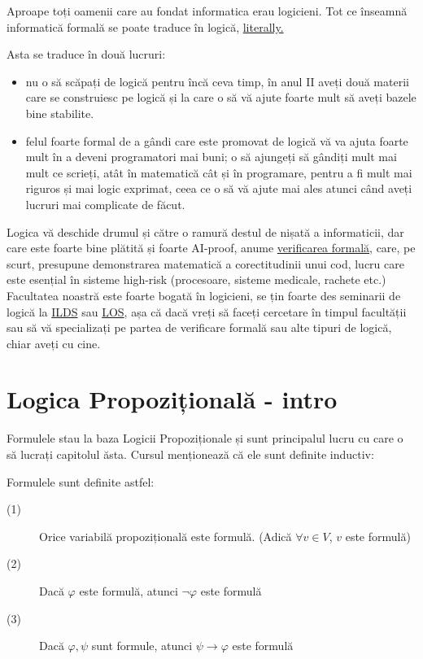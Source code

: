 Aproape toți oamenii care au fondat informatica erau logicieni. Tot ce înseamnă informatică formală se poate traduce în logică, \href{https://en.wikipedia.org/wiki/Curry%E2%80%93Howard_correspondence}{literally.}


\newpage

Asta se traduce în două lucruri:

\begin{itemize}
	\item nu o să scăpați de logică pentru încă ceva timp, în anul II aveți două materii care se construiesc pe logică și la care o să vă ajute foarte mult să aveți bazele bine stabilite.

	\item felul foarte formal de a gândi care este promovat de logică vă va ajuta foarte mult în a deveni programatori mai buni; o să ajungeți să gândiți mult mai mult ce scrieți, atât în matematică cât și în programare, pentru a fi mult mai riguros și
	      mai logic exprimat, ceea ce o să vă ajute mai ales atunci când aveți lucruri mai complicate de făcut.
\end{itemize}

Logica vă deschide drumul și către o ramură destul de nișată a informaticii, dar care este foarte bine plătită și foarte AI-proof, anume \href{https://en.wikipedia.org/wiki/Formal_verification}{verificarea formală}, care,
pe scurt, presupune demonstrarea matematică a corectitudinii unui cod, lucru care este esențial în sisteme high-risk (procesoare, sisteme medicale, rachete etc.) Facultatea noastră este foarte bogată în logicieni, se țin
foarte des seminarii de logică la \href{https://ilds.ro/}{ILDS} sau \href{https://los.cs.unibuc.ro/}{LOS}, așa că dacă vreți să faceți cercetare în timpul facultății sau să vă specializați pe partea de
verificare formală sau alte tipuri de logică, chiar aveți cu cine.

\section{Logica Propozițională - intro}

Formulele stau la baza Logicii Propoziționale și sunt principalul lucru cu care o să lucrați capitolul ăsta. Cursul menționează că ele sunt definite inductiv:

\begin{definition}[Formule]

	Formulele sunt definite astfel:

	\begin{description}
		\item[(1)] Orice variabilă propozițională este formulă. (Adică $\forall v \in V$, $v$ este formulă)
		\item[(2)] Dacă $\varphi$ este formulă, atunci $\neg \varphi$ este formulă
		\item[(3)] Dacă $\varphi, \psi$ sunt formule, atunci $\psi \to \varphi$ este formulă
	\end{description}

\end{definition}

